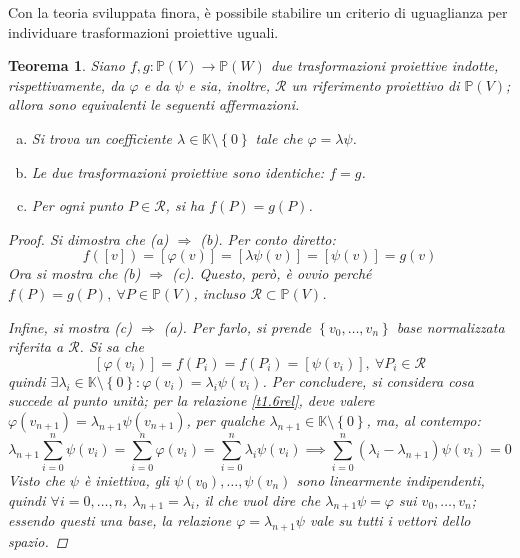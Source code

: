 \documentclass[11pt]{scrartcl}
\theoremstyle{style1}
\newtheorem{teorema}{Teorema}[section]
\numberwithin{equation}{subsection}
\begin{document}
\noindent Con la teoria sviluppata finora, \`e possibile stabilire un criterio di uguaglianza per individuare trasformazioni proiettive uguali.
\begin{teorema}\label{tpequiv}
	Siano $f,g  : \mathbb{P}(V) \to \mathbb{P}(W)$ due trasformazioni proiettive indotte, rispettivamente, da $\varphi $ e da $\psi $ e sia, inoltre, $\mathcal{R}  $ un riferimento proiettivo di $\mathbb{P}(V)$; allora sono equivalenti le seguenti affermazioni.
	\begin{enumerate}[(a).]
		\item Si trova un coefficiente $ \lambda \in \mathbb{K} \setminus\left\{ 0 \right\} $ tale che $\varphi  = \lambda \psi $.
		\item Le due trasformazioni proiettive sono identiche: $f = g$.
		\item Per ogni punto $P \in \mathcal{R} $, si ha $f(P) = g(P)$.
	\end{enumerate}
	\begin{proof}
		Si dimostra che (a) $\Rightarrow $ (b). 
		Per conto diretto:
		\[
			f([v]) =[\varphi (v)] = [\lambda \psi (v)]=[\psi (v)] = g(v)
		\] 
		Ora si mostra che (b) $\Rightarrow $ (c).
Questo, per\`o, \`e ovvio perch\'e $ f(P) = g(P), \ \forall P \in \mathbb{P}(V)$, incluso $\mathcal{R} \subset \mathbb{P}(V)$.

Infine, si mostra (c) $\Rightarrow $ (a).
Per farlo, si prende $\left\{ v_0,\ldots,v_n \right\} $ base normalizzata riferita a $\mathcal{R} $. 
Si sa che
\begin{equation}\label{t1.6rel}
	[\varphi (v_i)]=f(P_i)=f(P_i)=[\psi (v_i)], \ \forall P_i \in \mathcal{R} 
\end{equation}
quindi $\exists \lambda _i \in \mathbb{K}\setminus\left\{ 0 \right\} : \varphi (v_i) = \lambda _i \psi (v_i)$.
Per concludere, si considera cosa succede al punto unit\`a; per la relazione \ref{t1.6rel}, deve valere $\varphi (v_{n+1} )= \lambda _{n+1} \psi (v_{n+1} )$, per qualche $\lambda _{n+1} \in \mathbb{K}\setminus\left\{ 0 \right\} $, ma, al contempo:
\[
		\lambda _{n+1} \sum_{i=0}^{n} \psi (v_i) = \sum_{i=0}^{n} \varphi (v_i)= \sum_{i=0}^{n} \lambda _i\psi (v_i)\implies \sum_{i=0}^{n} (\lambda _i - \lambda _{n+1} ) \psi (v_i) = 0
\] 
Visto che $\psi $ \`e iniettiva, gli $\psi (v_0),\ldots,\psi (v_n)$ sono linearmente indipendenti, quindi $\forall i = 0,\ldots,n , \ \lambda _{n+1} = \lambda _i$, il che vuol dire che $\lambda _{n+1} \psi = \varphi $ sui $v_0,\ldots,v_n$; essendo questi una base, la relazione $\varphi  = \lambda _{n+1} \psi $ vale su tutti i vettori dello spazio.
	\end{proof}
\end{teorema}
\end{document}
